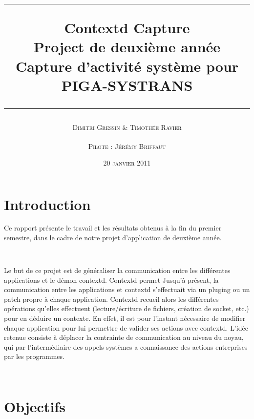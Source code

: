 \documentclass[pdftex,a4paper,titlepage,11pt,openright]{article}
\newcommand{\nom}[1]{\textsc{#1}}
\newcommand{\ligne}[1][1pt]{
  \par\noindent
  \rule[.5ex]{\linewidth}{#1}\par}
\newcommand{\clearemptydoublepage}{
	\newpage{\pagestyle{empty}\cleardoublepage}}
\begin{document}
\setlength{\parskip}{2.4ex}

\title{
\ligne{\Large}
\textbf{Contextd Capture}\\
\textbf{Project de deuxième année}\\
\Large Capture d'activité système pour PIGA-SYSTRANS
\ligne{\Large}
}
\author{\nom{Dimitri Gressin} \& \nom{Timothée Ravier}\\\\\nom{Pilote : Jérémy Briffaut}}
\date{20 \textsc{janvier} 2011} %

\maketitle

\clearemptydoublepage

\setcounter{secnumdepth}{2}
\setcounter{tocdepth}{2}
\tableofcontents
\addtocounter{page}{-1}

\newpage

\section*{Introduction} 
Ce rapport présente le travail et les résultats obtenus à la fin du premier semestre, dans le cadre de notre projet d'application de deuxième année.

~

Le but de ce projet est de généraliser la communication entre les différentes applications et le démon contextd. Contextd permet
Jusqu'à présent, la communication entre les applications et contextd s'effectuait via un pluging ou un patch propre à chaque application. Contextd recueil alors les différentes opérations qu'elles effectuent (lecture/écriture de fichiers, création de socket, etc.) pour en déduire un contexte. En effet, il est pour l'instant nécessaire de modifier chaque application pour lui permettre de valider ses actions avec contextd. L'idée retenue consiste à déplacer la contrainte de communication au niveau du noyau, qui par l'intermédiaire des appels systèmes a connaissance des actions entreprises par les programmes.

~

\section*{Objectifs} 
\end{document}
